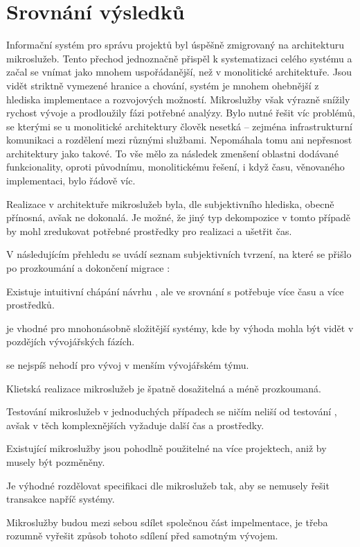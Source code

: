 \chapter{Srovnání výsledků}\label{ch:compare}


Informační systém pro správu projektů byl úspěšně zmigrovaný na architekturu mikroslužeb.
Tento přechod jednoznačně přispěl k systematizaci celého systému a začal se vnímat jako mnohem uspořádanější, než v monolitické architektuře.
Jsou vidět striktně vymezené hranice a chování, systém je mnohem ohebnější z hlediska implementace a rozvojových možností.
Mikroslužby však výrazně snížily rychost vývoje a prodloužily fázi potřebné analýzy.
Bylo nutné řešit víc problémů, se kterými se u monolitické architektury člověk nesetká – zejména infrastrukturní komunikaci a rozdělení  mezi různými službami.
Nepomáhala tomu ani nepřesnost architektury jako takové.
To vše mělo za následek zmenšení oblastni dodávané funkcionality, oproti původnímu, monolitickému řešení, i když času, věnovaného implementaci, bylo řádově víc.

Realizace  v architektuře mikroslužeb byla, dle subjektivního hlediska, obecně přínosná, avšak ne dokonalá.
Je možné, že jiný typ dekompozice v tomto případě by mohl zredukovat potřebné prostředky pro realizaci a ušetřit čas.


V následujícím přehledu se uvádí seznam subjektivních tvrzení, na které se přišlo po prozkoumání  a dokončení migrace :

\begin{ul}
   \item Existuje intuitivní chápání návrhu , ale ve srovnání s  potřebuje více času a více prostředků.
   \item {} je vhodné pro mnohonásobně složitější systémy, kde by výhoda mohla být vidět v pozdějích vývojářských fázích.
   \item {} se nejspíš nehodí pro vývoj v menším vývojářském týmu.
   \item Klietská realizace mikroslužeb je špatně dosažitelná a méně prozkoumaná.
   \item Testování mikroslužeb v jednoduchých případech se ničím neliší od testování , avšak v těch komplexnějších vyžaduje další čas a prostředky.
   \item Existující mikroslužby jsou pohodlně použitelné na více projektech, aniž by musely být pozměněny.
   \item Je výhodné rozdělovat specifikaci dle mikroslužeb tak, aby se nemusely řešit transakce napříč systémy.
   \item Mikroslužby budou mezi sebou sdílet společnou část impelmentace, je třeba rozumně vyřešit způsob tohoto sdílení před samotným vývojem.
\end{ul}





